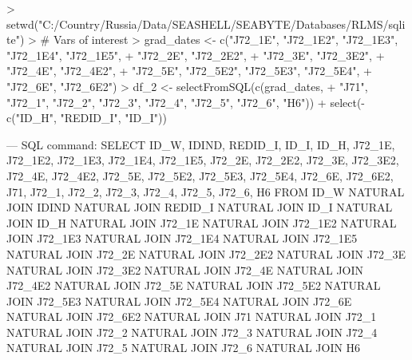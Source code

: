 \documentclass[12pt,a4paper]{article}
\begin{document}
\begin{Schunk}
\begin{Sinput}
> setwd("C:/Country/Russia/Data/SEASHELL/SEABYTE/Databases/RLMS/sqlite")
> # Vars of interest
> grad_dates <- c("J72_1E", "J72_1E2", "J72_1E3", "J72_1E4", "J72_1E5",
+                 "J72_2E", "J72_2E2",
+                 "J72_3E", "J72_3E2",
+                 "J72_4E", "J72_4E2",
+                 "J72_5E", "J72_5E2", "J72_5E3", "J72_5E4",
+                 "J72_6E", "J72_6E2")
> df_2 <- selectFromSQL(c(grad_dates, 
+                              "J71", "J72_1", "J72_2", "J72_3", "J72_4", "J72_5", "J72_6", "H6")) %
+                              select(-c("ID_H", "REDID_I", "ID_I"))
\end{Sinput}
\begin{Soutput}
--- SQL command:
SELECT ID_W, IDIND, REDID_I, ID_I, ID_H, J72_1E, J72_1E2, J72_1E3, J72_1E4, J72_1E5, J72_2E, J72_2E2, J72_3E, J72_3E2, J72_4E, J72_4E2, J72_5E, J72_5E2, J72_5E3, J72_5E4, J72_6E, J72_6E2, J71, J72_1, J72_2, J72_3, J72_4, J72_5, J72_6, H6 FROM ID_W NATURAL JOIN IDIND NATURAL JOIN REDID_I NATURAL JOIN ID_I NATURAL JOIN ID_H NATURAL JOIN J72_1E NATURAL JOIN J72_1E2 NATURAL JOIN J72_1E3 NATURAL JOIN J72_1E4 NATURAL JOIN J72_1E5 NATURAL JOIN J72_2E NATURAL JOIN J72_2E2 NATURAL JOIN J72_3E NATURAL JOIN J72_3E2 NATURAL JOIN J72_4E NATURAL JOIN J72_4E2 NATURAL JOIN J72_5E NATURAL JOIN J72_5E2 NATURAL JOIN J72_5E3 NATURAL JOIN J72_5E4 NATURAL JOIN J72_6E NATURAL JOIN J72_6E2 NATURAL JOIN J71 NATURAL JOIN J72_1 NATURAL JOIN J72_2 NATURAL JOIN J72_3 NATURAL JOIN J72_4 NATURAL JOIN J72_5 NATURAL JOIN J72_6 NATURAL JOIN H6 
\end{Soutput}
\end{Schunk}
\end{document}
